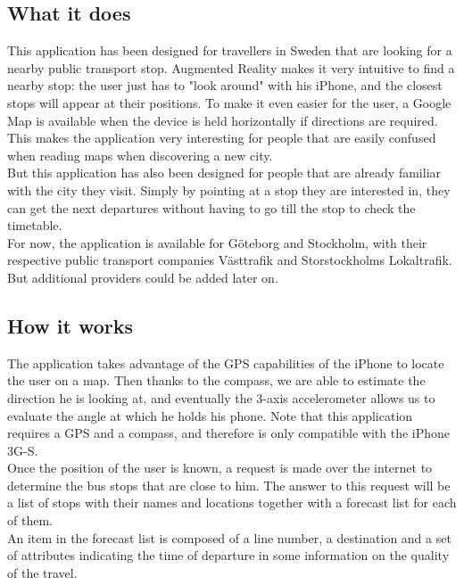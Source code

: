 \subsection{What it does}

This application has been designed for travellers in Sweden that are looking for a nearby public transport stop. Augmented Reality makes it very intuitive to find a nearby stop: the user just has to "look around" with his iPhone, and the closest stops will appear at their positions. To make it even easier for the user, a Google Map is available when the device is held horizontally if directions are required. \\

This makes the application very interesting for people that are easily confused when reading maps when discovering a new city.\\

But this application has also been designed for people that are already familiar with the city they visit. Simply by pointing at a stop they are interested in, they can get the next departures without having to go till the stop to check the timetable.\\

For now, the application is available for Göteborg and Stockholm, with their respective public transport companies Västtrafik and Storstockholms Lokaltrafik. But additional providers could be added later on.

\subsection{How it works}

The application takes advantage of the GPS capabilities of the iPhone to locate the user on a map. Then thanks to the compass, we are able to estimate the direction he is looking at, and eventually the 3-axis accelerometer allows us to evaluate the angle at which he holds his phone. Note that this application requires a GPS and a compass, and therefore is only compatible with the iPhone 3G-S.\\

Once the position of the user is known, a request is made over the internet to determine the bus stops that are close to him. The answer to this request will be a list of stops with their names and locations together with a forecast list for each of them.\\

An item in the forecast list is composed of a line number, a destination and a set of attributes indicating the time of departure in some information on the quality of the travel.\\

